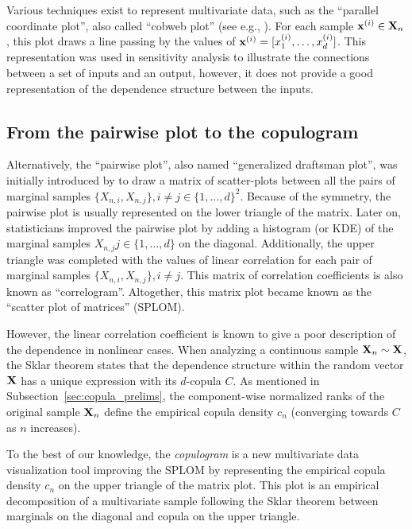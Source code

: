 Various techniques exist to represent multivariate data, such as the ``parallel coordinate plot'', also called ``cobweb plot'' (see e.g., \citealp{heinrich_2013_cobweb}). 
For each sample ${\bf x}^{(i)} \in {\bf X}_n$, this plot draws a line passing by the values of ${\bf x}^{(i)} = [x_1^{(i)}, \dots, x_d^{(i)}]$. 
This representation was used in sensitivity analysis to illustrate the connections between a set of inputs and an output, however, it does not provide a good representation of the dependence structure between the inputs. 

\subsection{From the pairwise plot to the copulogram}
Alternatively, the ``pairwise plot'', also named ``generalized draftsman plot'', was initially introduced by \citet{hartigan_1975_splom} to draw a matrix of scatter-plots between all the pairs of marginal samples $\{X_{n, i}, X_{n, j}\}, i \ne j \in \{1, \dots, d\}^2$. 
Because of the symmetry, the pairwise plot is usually represented on the lower triangle of the matrix. 
Later on, statisticians improved the pairwise plot by adding a histogram (or KDE) of the marginal samples $X_{n, j} j \in \{1, \dots, d\}$ on the diagonal. 
Additionally, the upper triangle was completed with the values of linear correlation for each pair of marginal samples $\{X_{n, i}, X_{n, j}\}, i \ne j$. 
This matrix of correlation coefficients is also known as ``correlogram''. 
Altogether, this matrix plot became known as the ``scatter plot of matrices'' (SPLOM). 

However, the linear correlation coefficient is known to give a poor description of the dependence in nonlinear cases. 
When analyzing a continuous sample ${\bf X}_n \sim {\bf X}$, the Sklar theorem states that the dependence structure within the random vector ${\bf X}$ has a unique expression with its $d$-copula $C$. 
As mentioned in Subsection~\ref{sec:copula_prelims}, the component-wise normalized ranks of the original sample ${\bf X}_n$ define the empirical copula density $c_n$ (converging towards $C$ as $n$ increases).

To the best of our knowledge, the \textit{copulogram} is a new multivariate data visualization tool improving the SPLOM by representing the empirical copula density $c_n$ on the upper triangle of the matrix plot. 
This plot is an empirical decomposition of a multivariate sample following the Sklar theorem between marginals on the diagonal and copula on the upper triangle.

